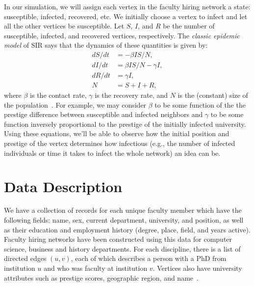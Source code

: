 \documentclass{article}
\begin{document}
In our simulation, we will assign each vertex in the faculty hiring network a
state: susceptible, infected, recovered, etc. We initially choose a vertex to
infect and let all the other vertices be susceptible. Let $S$, $I$, and $R$ be
the number of susceptible, infected, and recovered vertices, respectively. The \emph{classic epidemic model} of SIR says that the dynamics of these quantities is given by:
    \begin{align*}
        dS/dt &= -\beta IS/N,\\
        dI/dt &= \beta IS/N - \gamma I,\\
        dR/dt &= \gamma I,\\
        N &= S + I + R,
    \end{align*}
where $\beta$ is the contact rate, $\gamma$ is the recovery rate, and $N$ is the
(constant) size of the population~\cite{newman:networks,hethcote}. For example,
we may consider $\beta$ to be some function of the the prestige difference between susceptible and infected neighbors and $\gamma$ to be some function inversely proportional to the
prestige of the initially infected university. Using these equations, we'll be
able to observe how the initial position and prestige of the vertex determines how infectious (e.g., the number of infected individuals or time it takes to infect the whole network) an idea can be.


\section{Data Description}\label{proposal}

We have a collection of records for each unique faculty member which have the following fields: name, sex, current department, university, and position, as well as their education and employment history (degree, place, field, and years active). Faculty hiring networks have been constructed using this data for computer science, business and history departments. For each discipline, there is a list of directed edges $(u,v)$, each of which describes a person with a PhD from institution $u$ and who was faculty at institution $v$. Vertices also have university attributes such as prestige scores, geographic region, and name~\cite{clauset:hiring}.




\end{document}
